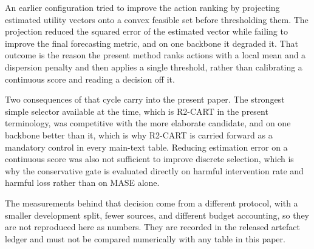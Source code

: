 \documentclass{article}
\begin{document}
An earlier configuration tried to improve the action ranking by projecting estimated utility
vectors onto a convex feasible set before thresholding them. The projection reduced the squared
error of the estimated vector while failing to improve the final forecasting metric, and on one
backbone it degraded it. That outcome is the reason the present method ranks actions with a
local mean and a dispersion penalty and then applies a single threshold, rather than
calibrating a continuous score and reading a decision off it.

Two consequences of that cycle carry into the present paper. The strongest simple selector
available at the time, which is R2-CART in the present terminology, was competitive with the
more elaborate candidate, and on one backbone better than it, which is why R2-CART is carried
forward as a mandatory control in every main-text table. Reducing estimation error on a
continuous score was also not sufficient to improve discrete selection, which is why the
conservative gate is evaluated directly on harmful intervention rate and harmful loss rather
than on MASE alone.

The measurements behind that decision come from a different protocol, with a smaller
development split, fewer sources, and different budget accounting, so they are not reproduced
here as numbers. They are recorded in the released artefact ledger and must not be compared
numerically with any table in this paper.
\end{document}
